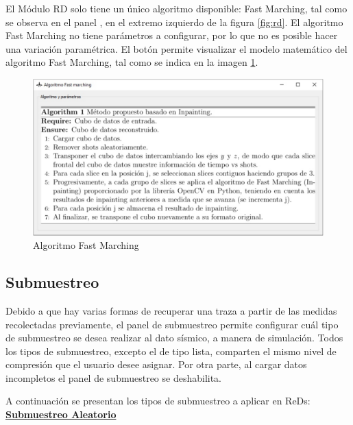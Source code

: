 \documentclass[12pt,twoside,letter]{ol-softwaremanual}
\newcommand*\circled[1]{\tikz[baseline=(char.base)]{
            \node[shape=circle,draw,inner sep=2pt] (char) {#1};}}
\begin{document}
El Módulo RD solo tiene un único algoritmo disponible: Fast Marching, tal como se observa en el panel \circled{2}, en el extremo izquierdo de la figura \ref{fig:rd}. El algoritmo Fast Marching no tiene parámetros a configurar, por lo que no es posible hacer una variación paramétrica. El botón\hspace{0.5mm} \faEye \hspace{0.5mm} permite visualizar el modelo matemático del algoritmo Fast Marching, tal como se indica en la imagen \ref{fig:fast}.

\begin{figure}
		\centering
		\includegraphics[width=\textwidth]{fast.pdf}
		\caption{Algoritmo Fast Marching}
		\label{fig:fast}	
\end{figure}

\subsection{Submuestreo}\label{subsamplingrd}

Debido a que hay varias formas de recuperar una traza a partir de las medidas recolectadas previamente, el panel de submuestreo \circled{3} permite configurar cuál tipo de submuestreo se desea realizar al dato sísmico, a manera de simulación. Todos los tipos de submuestreo, excepto el de tipo lista, comparten el mismo nivel de compresión que el usuario desee asignar. Por otra parte, al cargar datos incompletos el panel de submuestreo se deshabilita.

A continuación se presentan los tipos de submuestreo a aplicar en ReDs:\\

\underline{\textbf{Submuestreo Aleatorio}}
\end{document}
